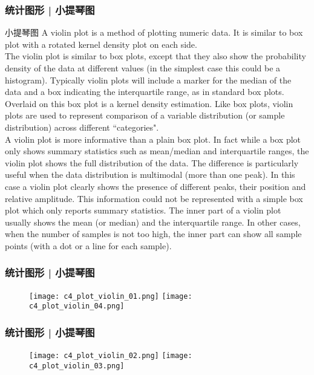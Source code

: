 \begin{frame}
  \frametitle{统计图形 | 小提琴图}
  \begin{block}{小提琴图}
    {\footnotesize
    A violin plot is a method of plotting numeric data. It is similar to box plot with a rotated kernel density plot on each side.\\
    \vspace{0.5em}
The violin plot is similar to box plots, except that they also show the probability density of the data at different values (in the simplest case this could be a histogram). Typically violin plots will include a marker for the median of the data and a box indicating the interquartile range, as in standard box plots. Overlaid on this box plot is a kernel density estimation. Like box plots, violin plots are used to represent comparison of a variable distribution (or sample distribution) across different ``categories".\\
\vspace{0.5em}
A violin plot is more informative than a plain box plot. In fact while a box plot only shows summary statistics such as mean/median and interquartile ranges, the violin plot shows the full distribution of the data. The difference is particularly useful when the data distribution is multimodal (more than one peak). In this case a violin plot clearly shows the presence of different peaks, their position and relative amplitude. This information could not be represented with a simple box plot which only reports summary statistics. The inner part of a violin plot usually shows the mean (or median) and the interquartile range. In other cases, when the number of samples is not too high, the inner part can show all sample points (with a dot or a line for each sample).\\
    }
  \end{block}
\end{frame}

\begin{frame}
  \frametitle{统计图形 | 小提琴图}
  \begin{figure}
    \centering
    \texttt{[image: c4\_plot\_violin\_01.png]}
    \texttt{[image: c4\_plot\_violin\_04.png]}
  \end{figure}
\end{frame}

\begin{frame}
  \frametitle{统计图形 | 小提琴图}
  \begin{figure}
    \centering
    \texttt{[image: c4\_plot\_violin\_02.png]}
    \texttt{[image: c4\_plot\_violin\_03.png]}
  \end{figure}
\end{frame}

